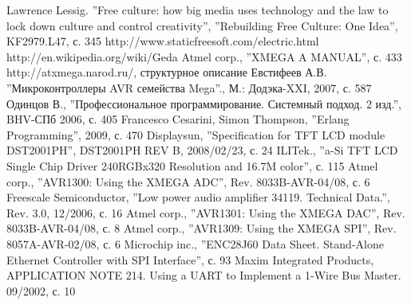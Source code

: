 \documentclass[russian,utf8,12pt,emptystyle,pointsingle,reduceheight=20mm]{eskdtext}
\begin{document}
\begin{thebibliography}{99}
 Lawrence Lessig. ''Free culture: how big media uses technology and the law to lock down
culture and control creativity'', ''Rebuilding Free Culture: One Idea'', KF2979.L47, с. 345
 http://www.staticfreesoft.com/electric.html
 http://en.wikipedia.org/wiki/Geda
 Atmel corp., ''XMEGA A MANUAL'', с. 433
 http://atxmega.narod.ru/, структурное описание
 Евстифеев А.В. ''Микроконтроллеры AVR семейства Mega''., М.: Додэка-XXI, 2007, с. 587
 Одинцов В., ''Профессиональное программирование. Системный подход. 2 изд.'', BHV-СПб 2006, с. 405
 Francesco Cesarini, Simon Thompson, ''Erlang Programming'', 2009, с. 470
 Displaysun, ''Specification for TFT LCD module DST2001PH'', DST2001PH REV B, 2008/02/23, с. 24
 ILITek., ''a-Si TFT LCD Single Chip Driver 240RGBx320 Resolution and 16.7M color'', с. 115
 Atmel corp., ''AVR1300: Using the XMEGA ADC'', Rev. 8033B-AVR-04/08, с. 6
 Freescale Semiconductor, ''Low power audio amplifier 34119. Technical Data.'', Rev. 3.0, 12/2006, с. 16
 Atmel corp., ''AVR1301: Using the XMEGA DAC'', Rev. 8033B-AVR-04/08, с. 8
 Atmel corp., ''AVR1309: Using the XMEGA SPI'', Rev. 8057A-AVR-02/08, с. 6
 Microchip inc., ''ENC28J60 Data Sheet. Stand-Alone Ethernet Controller with SPI Interface'', с. 93
 Maxim Integrated Products, APPLICATION NOTE 214. Using a UART to Implement a 1-Wire Bus Master. 09/2002, с. 10

\end{thebibliography}


\end{document}
